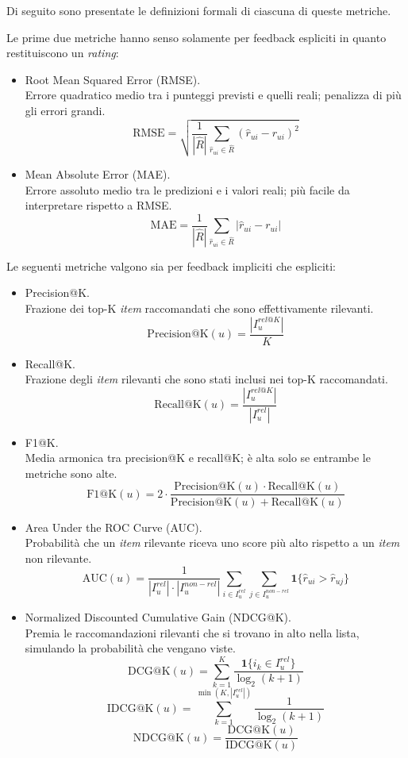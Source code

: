 Di seguito sono presentate le definizioni formali di ciascuna di queste metriche.

Le prime due metriche hanno senso solamente per feedback espliciti in quanto restituiscono un \textit{rating}:

\begin{itemize}
    \item Root Mean Squared Error (RMSE).\\
    Errore quadratico medio tra i punteggi previsti e quelli reali; penalizza di più gli errori grandi.
    \[
    \text{RMSE} = \sqrt{ \frac{1}{|\hat{R}|} \sum_{\hat{r}_{ui} \in \hat{R}} (\hat{r}_{ui} - r_{ui})^2 }
    \]
    
    \item Mean Absolute Error (MAE).\\
    Errore assoluto medio tra le predizioni e i valori reali; più facile da interpretare rispetto a RMSE.
    \[
    \text{MAE} = \frac{1}{|\hat{R}|} \sum_{\hat{r}_{ui} \in \hat{R}} |\hat{r}_{ui} - r_{ui}|
    \]
\end{itemize}   

Le seguenti metriche valgono sia per feedback impliciti che espliciti:

\begin{itemize}
    \item Precision@K.\\
    Frazione dei top-K \textit{item} raccomandati che sono effettivamente rilevanti.
    \[
    \text{Precision@K}(u) = \frac{|I_u^{rel@K}|}{K}
    \]
    
    \item Recall@K.\\
    Frazione degli \textit{item} rilevanti che sono stati inclusi nei top-K raccomandati.
    \[
    \text{Recall@K}(u) = \frac{|I_u^{rel@K}|}{|I_u^{rel}|}
    \]
    
    \item F1@K.\\
    Media armonica tra precision@K e recall@K; è alta solo se entrambe le metriche sono alte.
    \[
    \text{F1@K}(u) = 2 \cdot \frac{\text{Precision@K}(u) \cdot \text{Recall@K}(u)}{\text{Precision@K}(u) + \text{Recall@K}(u)}
    \]
    
    \item Area Under the ROC Curve (AUC).\\
    Probabilità che un \textit{item} rilevante riceva uno score più alto rispetto a un \textit{item} non rilevante.
    \[
    \text{AUC}(u) = \frac{1}{|I_u^{rel}| \cdot |I_u^{non-rel}|} \sum_{i \in I_u^{rel}} \sum_{j \in I_u^{non-rel}} \mathbf{1}\{\hat{r}_{ui} > \hat{r}_{uj}\}
    \]
    
    \item Normalized Discounted Cumulative Gain (NDCG@K).\\
    Premia le raccomandazioni rilevanti che si trovano in alto nella lista, simulando la probabilità che vengano viste.
    \[
    \text{DCG@K}(u) = \sum_{k=1}^{K} \frac{\mathbf{1}\{i_k \in I_u^{rel}\}}{\log_2(k + 1)}
    \]
    \[
    \text{IDCG@K}(u) = \sum_{k=1}^{\min(K, |I_u^{rel}|)} \frac{1}{\log_2(k + 1)}
    \]
    \[
    \text{NDCG@K}(u) = \frac{\text{DCG@K}(u)}{\text{IDCG@K}(u)}
    \]
\end{itemize}